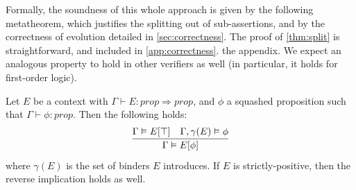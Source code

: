 \documentclass[runningheads]{llncs}
\newcommand{\comm}[3]{\ifcheckpagebudget\else\ifdraft{{\color{#1}[#2: #3]}}\fi\fi}
\newcommand{\nik}[1]{\comm{dkpurple}{Nik}{#1}}
\newcommand{\guido}[1]{\comm{blue}{Guido}{#1}}
\begin{document}

Formally, the soundness of this whole approach is given by the following
metatheorem, which justifies the splitting out of sub-assertions,
and by the correctness of evolution detailed in \autoref{sec:correctness}.
%
The proof of \autoref{thm:split} is straightforward, and included in
\iffull
\autoref{app:correctness}.
\else
the appendix.
\fi
%
We expect an analogous property
to hold in other verifiers as well (in particular, it
holds for first-order logic).

\begin{theorem}
    \label{thm:split}
    Let $E$ be a context with 
    $\Gamma \vdash E : prop \Rightarrow prop$,
    and $\phi$ a squashed proposition such that $\Gamma \vdash \phi : prop$.
    Then the following holds:
    \[
        \infer{\Gamma \vDash E[\phi]}
              {\Gamma \vDash E[\top] & \Gamma, \gamma(E) \vDash \phi}
    \]
    where $\gamma(E)$ is the set of binders $E$ introduces.
    If $E$ is strictly-positive, then the reverse implication holds as well.
\end{theorem}
%










\end{document}

